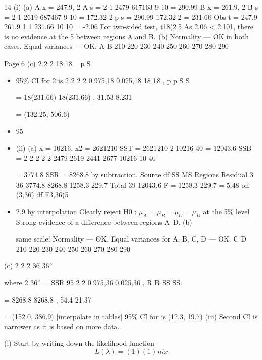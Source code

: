 \documentclass[a4paper,12pt]{article}
\begin{document}
14 (i) (a) A
x = 247.9, 2
A
s =
2 1 2479
617163
9 10
= 290.99
B
x = 261.9, 2
B
s =
2 1 2619
687467
9 10
= 172.32
2
p
s =
290.99 172.32
2
= 231.66
Obs t =
247.9 261.9
1 1
231.66
10 10
= -2.06
For two-sided test, t18(2.5%
As 2.06 < 2.101, there is no evidence at the 5%
between regions A and B.
(b)
Normality — OK in both cases.
Equal variances — OK.
A
B
210 220 230 240 250 260 270 280 290

Page 6
(c)
2
2
2 18
18
~ p
S

\begin{itemize}
    \item 
 95\% CI for 2 is
2 2
2 2
0.975,18 0.025,18
18 18
, p p
 S S 
 
=
18(231.66) 18(231.66)
,
31.53 8.231


= (132.25, 506.6)
\item  95%
\item (ii) (a) x = 10216, x2 = 2621210
SST = 2621210 
2 10216
40
= 12043.6
SSB =
2 2 2 2 2 2479 2619 2441 2677 10216
10 40
  
 = 3774.8
 SSR = 8268.8 by subtraction.
Source df SS MS
Regions
Residual
3
36
3774.8
8268.8
1258.3
229.7
Total 39 12043.6
F =
1258.3
229.7
= 5.48 on (3,36) df
F3,36(5%

\item 2.9 by interpolation
Clearly reject H0 : $\mu_A = \mu_B = \mu_C = \mu_D$ at the 5\% level
 Strong evidence of a difference between regions A–D.
(b)
\item [same scale!]
Normality — OK.
Equal variances for A, B, C, D — OK.
 C
D
210 220 230 240 250 260 270 280 290
\end{itemize}
(c)
2
2
2 36
36ˆ
~



where 2 36ˆ = SSR
 95%
2 2
0.975,36 0.025,36
,
R R  SS SS 

=
8268.8 8268.8
,
54.4 21.37
 

= (152.0, 386.9) [interpolate in tables]
 95\% CI for  is (12.3, 19.7)
(iii) Second CI is narrower as it is based on more data.



\item (i) Start by writing down the likelihood function
\[L(\lambda) =
( 1)
(1 )
n
i x\]
\end{document}
